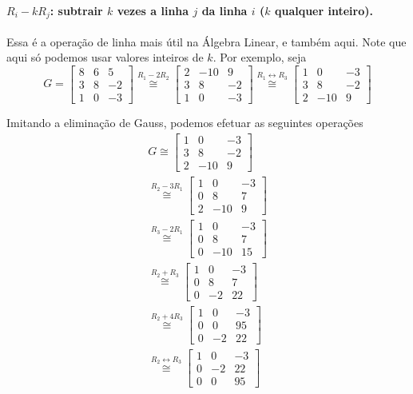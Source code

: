 	\paragraph{$R_i - kR_j$: subtrair $k$ vezes a linha $j$ da linha $i$ ($k$ qualquer inteiro).} Essa é a operação de linha mais útil na Álgebra Linear, e também aqui. Note que aqui só podemos usar valores inteiros de $k$. Por exemplo, seja
	$$
	G = \begin{bmatrix}
	8 & 6 & 5 \\
	3 & 8 & -2 \\
	1 & 0 & -3
	\end{bmatrix} \stackrel{R_1 - 2R_2}{\cong} \begin{bmatrix}
	2 & -10 & 9 \\
	3 & 8 & -2 \\
	1 & 0 & -3
	\end{bmatrix} \stackrel{R_1\leftrightarrow R_3}{\cong} \begin{bmatrix}
	1 & 0 & -3 \\
	3 & 8 & -2 \\
	2 & -10 & 9
	\end{bmatrix}
	$$ 
	\par\vspace{0.3cm} Imitando a eliminação de Gauss, podemos efetuar as seguintes operações
	\begin{align*} 
	G \cong \begin{bmatrix}
	1 & 0 & -3 \\
	3 & 8 & -2 \\
	2 & -10 & 9
	\end{bmatrix} \\ \stackrel{R_2 - 3R_1}{\cong} \begin{bmatrix}
	1 & 0 & -3 \\
	0 & 8 & 7 \\
	2 & -10 & 9
	\end{bmatrix} \\ \stackrel{R_3 - 2R_1}{\cong} \begin{bmatrix}
	1 & 0 & -3 \\
	0 & 8 & 7 \\
	0 & -10 & 15
	\end{bmatrix} \\ \stackrel{R_2 + R_3}{\cong} \begin{bmatrix}
	1 & 0 & -3 \\
	0 & 8 & 7 \\
	0 & -2 & 22
	\end{bmatrix} \\ \stackrel{R_2 + 4R_3}{\cong} \begin{bmatrix}
	1 & 0 & -3 \\
	0 & 0 & 95 \\
	0 & -2 & 22
	\end{bmatrix} \\ \stackrel{R_2\leftrightarrow R_3}{\cong} \begin{bmatrix}
	1 & 0 & -3 \\
	0 & -2 & 22 \\
	0 & 0 & 95 
	\end{bmatrix}
	\end{align*} 
